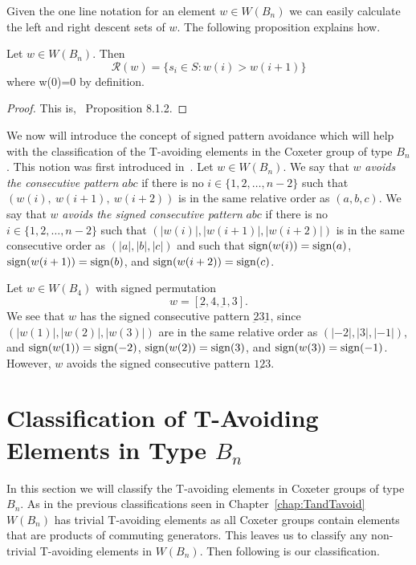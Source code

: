 Given the one line notation for an element $w \in W(B_n)$ we can easily calculate the left and right descent sets of $w$. The following proposition explains how.

\begin{proposition}\label{prop:descent}
Let $w \in W(B_n)$. Then 
\[ \mathcal{R}(w)=\{s_i \in S: w(i) > w(i+1)\} \]
where w(0)=0 by definition.
\begin{proof}
	This is,~\cite{Bjorner2005} Proposition 8.1.2.
\end{proof}
\end{proposition}

We now will introduce the concept of signed pattern avoidance which will help with the classification of the T-avoiding elements in the Coxeter group of type $B_n$. This notion was first introduced in~\cite{Gern2013a}. Let $w \in W(B_n)$. We say that $w$ \emph{avoids the consecutive pattern} $abc$ if there is no $i \in \{1,2, \ldots, n-2\}$ such that $(w(i),~w(i+1),~w(i+2))$ is in the same relative order as $(a,b,c).$ We say that $w$ \emph{avoids the signed consecutive pattern} $abc$ if there is no $i \in \{1,2, \ldots, n-2\}$ such that $\left(|w(i)|, |w(i+1)|, |w(i+2)|\right)$ is in the same consecutive order as $\left(|a|, |b|, |c| \right)$ and such that $\mathrm{sign}(w(i))=\mathrm{sign}(a)$, $\mathrm{sign}(w(i+1))=\mathrm{sign}(b)$, and $\mathrm{sign}(w(i+2))=\mathrm{sign}(c)$.

\begin{example}
Let $w \in W(B_4)$ with signed permutation \[w=[\underbar{2},4, \underbar{1}, 3].\] We see that $w$ has the signed consecutive pattern $\underbar{2} 3 \underbar{1}$, since $(|w(1)|, |w(2)|, |w(3)|)$ are in the same relative order as $(|-2|, |3|, |-1|)$, and $\mathrm{sign}(w(1))=\mathrm{sign}(-2)$, $\mathrm{sign}(w(2))=\mathrm{sign}(3)$, and $\mathrm{sign}(w(3))=\mathrm{sign}(-1)$. However, $w$ avoids the signed consecutive pattern $1\underbar{2}3$.
\end{example}

\section{Classification of T-Avoiding Elements in Type $B_n$}\label{sec:TAB}

In this section we will classify the T-avoiding elements in Coxeter groups of type $B_n$. As in the previous classifications seen in Chapter~\ref{chap:TandTavoid} $W(B_n)$ has trivial T-avoiding elements as all Coxeter groups contain elements that are products of commuting generators. This leaves us to classify any non-trivial T-avoiding elements in $W(B_n)$. Then following is our classification.

